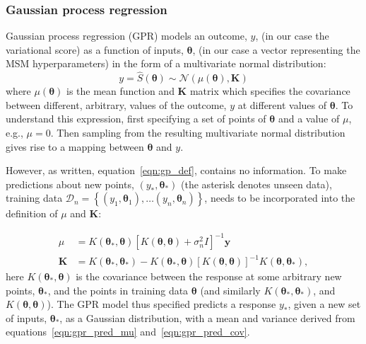 \documentclass[journal=jacsat,manuscript=article]{achemso}
\begin{document}
\subsubsection{Gaussian process regression}

Gaussian process regression (GPR) models an outcome, $y$, (in our case the variational score) as a function of inputs, $\bm{\theta}$, (in our case a vector representing the MSM hyperparameters) in the form of a multivariate normal distribution: 
\begin{equation}
   y = \hat{S}(\bm{\theta}) \sim \mathcal{N}\left(\mu(\bm{\theta}), \mathbf{K}\right ) \label{eqn:gp_def}
\end{equation}
where $\mu(\bm{\theta})$ is the mean function and $\mathbf{K}$ matrix which specifies the covariance between different, arbitrary, values of the outcome, $y$ at different values of $\bm{\theta}$. To understand this expression, first specifying a set of points of $\bm{\theta}$ and a value of $\mu$, e.g., $\mu=0$. Then sampling from the resulting multivariate normal distribution gives rise to a mapping between $\bm{\theta}$ and $y$.

However, as written, equation~\ref{eqn:gp_def}, contains no information.  To make predictions about new points, $(y_{*}, \bm{\theta}_{*})$ (the asterisk denotes unseen data), training data $\mathcal{D}_{n}=\left\{(y_1, \bm{\theta}_1),  \ldots (y_n, \bm{\theta}_n) \right \}$,  needs to be incorporated into the definition of  $\mu$ and $\mathbf{K}$:  

$$
\begin{aligned}
\mu & =K\left(\bm{\theta}_*, \bm{\theta}\right)\left[K(\bm{\theta}, \bm{\theta})+\sigma_n^2 I\right]^{-1} \mathbf{y} \label{eqn:gpr_pred_mu} \\
\mathbf{K} &=K\left(\bm{\theta}_*, \bm{\theta}_*\right)-K\left(\bm{\theta}_*, \bm{\theta}\right)\left[K(\bm{\theta}, \bm{\theta})\right]^{-1} K\left(\bm{\theta}, \bm{\theta}_*\right), \label{eqn:gpr_pred_cov}
\end{aligned}
$$
here $K\left(\bm{\theta}_*, \bm{\theta}\right)$ is the covariance between the response at some arbitrary new points, $\bm{\theta}_*$, and the points in training data $\bm{\theta}$ (and similarly $K\left(\bm{\theta}_*, \bm{\theta}_*\right)$, and $K\left(\bm{\theta}, \bm{\theta}\right)$). The GPR model thus specified predicts a response $y_*$, given a new set of inputs, $\bm{\theta}_*$, as a Gaussian distribution, with a mean and variance derived from equations~\ref{eqn:gpr_pred_mu} and~\ref{eqn:gpr_pred_cov}. 
\end{document}
